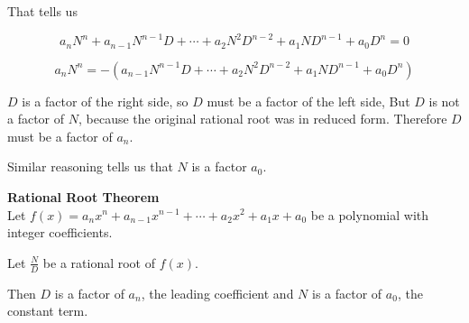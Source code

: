 \documentclass{ximera}
\begin{document}
That tells us

\[   a_n N^n + a_{n-1} N^{n-1} D + \cdots + a_2 N^2 D^{n-2}+ a_1 N D^{n-1} + a_0 D^n  = 0       \]



\[   a_n N^n  =   -(a_{n-1} N^{n-1} D + \cdots + a_2 N^2 D^{n-2}+ a_1 N D^{n-1} + a_0 D^n)      \]


$D$ is a factor of the right side, so $D$ must be a factor of the left side,  But $D$ is not a factor of $N$, because the original rational root was in reduced form.  Therefore $D$ must be a factor of $a_n$.

Similar reasoning tells us that $N$ is a factor  $a_0$.





\begin{theorem} \textbf{\textcolor{blue!55!black}{Rational Root Theorem}} \\


Let $ f(x) = a_n x^n + a_{n-1} x^{n-1} + \cdots + a_2 x^2 + a_1 x + a_0 $ be a polynomial with integer coefficients.

Let $\frac{N}{D}$ be a rational root of $f(x)$.

Then $D$ is a factor of $a_n$, the leading coefficient and $N$ is a factor of $a_0$, the constant term.

\end{theorem}
\end{document}
